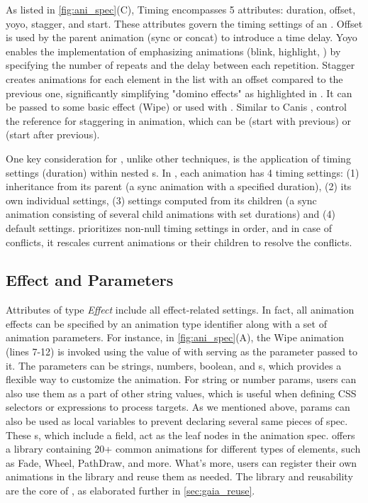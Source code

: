 As listed in \autoref{fig:ani_spec}(C), Timing encompasses 5 attributes: duration, offset, yoyo, stagger, and start.
These attributes govern the timing settings of an \aniunit{}.
Offset is used by the parent animation (\eg sync or concat) to introduce a time delay.
Yoyo enables the implementation of emphasizing animations (\eg blink, highlight, \etcns) by specifying the number of repeats and the delay between each repetition.
Stagger creates animations for each element in the list with an offset compared to the previous one, significantly simplifying "domino effects" as highlighted in \cite{shi2021communicating}.
It can be passed to some basic effect (\eg Wipe) or used with .
Similar to Canis \cite{ge2020canis},  control the reference for staggering in  animation, which can be  (start with previous) or  (start after previous).

One key consideration for \gaia{}, unlike other techniques, is the application of timing settings (\ie duration) within nested \aniunit{}s.
In \gaia{}, each animation has 4 timing settings: 
(1) inheritance from its parent (\eg a sync animation with a specified duration), 
(2) its own individual settings, 
(3) settings computed from its children (\eg a sync animation consisting of several child animations with set durations) and 
(4) default settings.
\gaia{} prioritizes non-null timing settings in order, and in case of conflicts, it rescales current animations or their children to resolve the conflicts.


\subsection{Effect and Parameters}
\label{ssec:gaia_ani_effect}

Attributes of type \textit{Effect} include all effect-related settings.
In fact, all animation effects can be specified by an animation type identifier along with a set of animation parameters.
For instance, in \autoref{fig:ani_spec}(A), the Wipe animation (lines 7-12) is invoked using the value of  with  serving as the parameter passed to it. 
The parameters can be strings, numbers, boolean, and \aniunit{}s, which provides a flexible way to customize the animation.
For string or number params, users can also use them as a part of other string values, which is useful when defining CSS selectors or expressions to process targets.
As we mentioned above, params can also be used as local variables to prevent declaring several same pieces of spec.
These \aniunit{}s, which include a  field, act as the leaf nodes in the animation spec. 
\gaia{} offers a library containing 20+ common animations for different types of elements, such as Fade, Wheel, PathDraw, and more. 
What's more, users can register their own animations in the library and reuse them as needed. 
The library and reusability are the core of \gaia{}, as elaborated further in \autoref{sec:gaia_reuse}.

